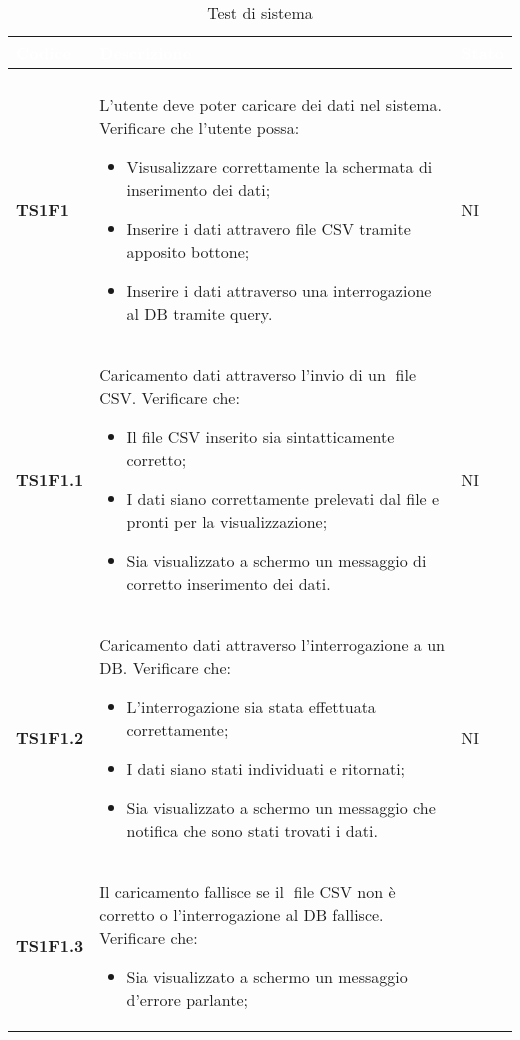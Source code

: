 \begin{longtable}{C{2.5cm} | C{12cm} C{2cm}} 
		\textcolor{white}{\textbf{Codice}} & 
		\textcolor{white}{\textbf{Descrizione}} & 
		\textcolor{white}{\textbf{Stato}} \\
		\endfirsthead
		\\
	    \endfoot
	    \caption{Test di sistema}
	    \endlastfoot
		\hline
\textbf{TS1F1} & L'utente deve poter caricare dei dati nel sistema. Verificare che l'utente possa: 
					\begin{itemize}
						\item Visusalizzare correttamente la schermata di inserimento dei dati;
						\item Inserire i dati attravero file CSV tramite apposito bottone;
						\item Inserire i dati attraverso una interrogazione al DB tramite query.	
					\end{itemize}					 			    
			  & NI\\
\textbf{TS1F1.1} & Caricamento dati attraverso l'invio di un file CSV. Verificare che:
					\begin{itemize}
						\item Il file CSV inserito sia sintatticamente corretto; 
						\item I dati siano correttamente prelevati dal file e pronti per la visualizzazione;
						\item Sia visualizzato a schermo un messaggio di corretto inserimento dei dati.
					\end{itemize}													
		         & NI \\
\textbf{TS1F1.2} & Caricamento dati attraverso l'interrogazione a un DB. Verificare che:
					\begin{itemize}
						\item L'interrogazione sia stata effettuata correttamente; 
						\item I dati siano stati individuati e ritornati;
						\item Sia visualizzato a schermo un messaggio che notifica che sono stati trovati i dati.
					\end{itemize}
 				 & NI \\ 
\textbf{TS1F1.3} &  Il caricamento fallisce se il file CSV non è corretto o l'interrogazione al DB fallisce. Verificare che:
					\begin{itemize}
						\item Sia visualizzato a schermo un messaggio d'errore parlante; 

\end{itemize}
\end{longtable}
